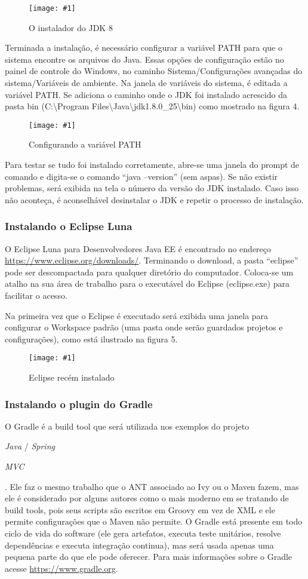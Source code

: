 \documentclass[a4paper,12pt]{article}
\newcommand{\spring} {
	\lang{Java}/\est{Spring} \sigla{MVC}
}
\newcommand{\figura}[2] {
	\begin{figure}[H]
		\centering
		\texttt{[image: \#1]}
		\caption{#2}
	\end{figure}
	\FloatBarrier
}
\newcommand{\est}[1] {
	\textit{#1}
}
\newcommand{\sigla}[1] {
	\textit{#1}
}
\newcommand{\lang}[1] {
	\textit{#1}
}
\begin{document}
\figura{jdk81.jpg}{O instalador do JDK 8}

Terminada a instalação, é necessário configurar a variável PATH para que o sistema encontre os arquivos do Java. Essas opções de configuração estão no painel de controle do Windows, no caminho Sistema/Configurações avançadas do sistema/Variáveis de ambiente. Na janela de variáveis do sistema, é editada a variável PATH. Se adiciona o caminho onde o JDK foi instalado acrescido da pasta bin (C:\textbackslash Program Files\textbackslash Java\textbackslash jdk\textmd{1.8.0\_25}\textbackslash bin) como mostrado na figura 4.

\figura{path1.png}{Configurando a variável PATH}

Para testar se tudo foi instalado corretamente, abre-se uma janela do prompt de comando e digita-se o comando “java –version” (sem aspas). Se não existir problemas, será exibida na tela o número da versão do JDK instalado. Caso isso não aconteça, é aconselhável desinstalar o JDK e repetir o processo de instalação. 

\subsubsection{Instalando o Eclipse Luna} 

O Eclipse Luna para Desenvolvedores Java EE é encontrado no endereço \url{https://www.eclipse.org/downloads/}. Terminando o download, a pasta “eclipse” pode ser descompactada para qualquer diretório do computador. Coloca-se um atalho na sua área de trabalho para o executável do Eclipse (eclipse.exe) para facilitar o acesso.

Na primeira vez que o Eclipse é executado será exibida uma janela para configurar o Workspace padrão (uma pasta onde serão guardados projetos e configurações), como está ilustrado na figura 5.

\figura{eclipse1.png}{Eclipse recém instalado}

\subsubsection{Instalando o plugin do Gradle} 

O Gradle é a build tool que será utilizada nos exemplos do projeto \spring. Ele faz o mesmo trabalho que o ANT associado ao Ivy ou o Maven fazem, mas ele é considerado por alguns autores como o mais moderno em se tratando de build tools, pois seus scripts são escritos em Groovy em vez de XML e ele permite configurações que o Maven não permite. O Gradle está presente em todo ciclo de vida do software (ele gera artefatos, executa teste unitários, resolve dependências e executa integração continua), mas será usada apenas uma pequena parte do que ele pode oferecer. Para mais informações sobre o Gradle acesse \url{https://www.gradle.org}. 
\end{document}
